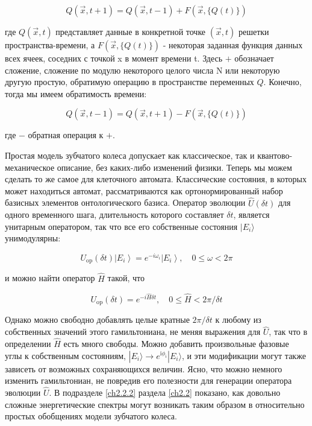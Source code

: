 \documentclass[main.tex]{subfiles}
\begin{document}
\begin{equation}\label{5.2}
	Q(\vec{x}, t+1)=Q(\vec{x}, t-1)+F(\vec{x},\{Q(t)\})
\end{equation}

где $Q(\vec{x}, t)$ представляет данные в конкретной точке $(\vec{x}, t)$ решетки пространства-времени, а $F(\vec{x},\{Q(t)\})$ - некоторая заданная функция данных всех ячеек, соседних с точкой x в момент времени t. Здесь $+$ обозначает сложение, сложение по модулю некоторого целого числа N или некоторую другую простую, обратимую операцию в пространстве переменных $Q$. Конечно, тогда мы имеем обратимость времени:             


\begin{equation}\label{5.3}
	Q(\vec{x}, t-1)=Q(\vec{x}, t+1)-F(\vec{x},\{Q(t)\})
\end{equation}
            
где $-$ обратная операция к $+$.

Простая модель зубчатого колеса допускает как классическое, так и квантово-механическое описание, без каких-либо изменений физики. Теперь мы можем сделать то же самое для клеточного автомата. Классические состояния, в которых может находиться автомат, рассматриваются как ортонормированный набор базисных элементов онтологического базиса. Оператор эволюции $\hat U(\delta t)$ для одного временного шага, длительность которого составляет $\delta t$, является унитарным оператором, так что все его собственные состояния $|E_i\rangle$ унимодулярны:

\begin{equation}\label{5.4}
	U_{\mathrm{op}}(\delta t)\left|E_{i}\right\rangle= e^{-i \omega_{i}}\left|E_{i}\right\rangle, \quad 0 \leq \omega<2 \pi
\end{equation}

и можно найти оператор $\hat H$ такой, что

\begin{equation}\label{5.5}
	U_{\mathrm{op}}(\delta t)= e^{-i \hat H \delta t}, \quad 0 \leq \hat H<2 \pi/\delta t
\end{equation}

Однако можно свободно добавлять целые кратные $2\pi / \delta t$ к любому из собственных значений этого гамильтониана, не меняя выражения для $\hat U$, так что в определении $\hat H$ есть много свободы. Можно добавить произвольные фазовые углы к собственным состояниям, $|E_i\rangle \rightarrow e^{\mathrm i \phi_i}|E_i\rangle$, и эти модификации могут также зависеть от возможных сохраняющихся величин. Ясно, что можно немного изменить гамильтониан, не повредив его полезности для генерации оператора эволюции $\hat U$. В подразделе \ref{ch2.2.2} раздела \ref{ch2.2} показано, как довольно сложные энергетические спектры могут возникать таким образом в относительно простых обобщениях модели зубчатого колеса.
\end{document}

